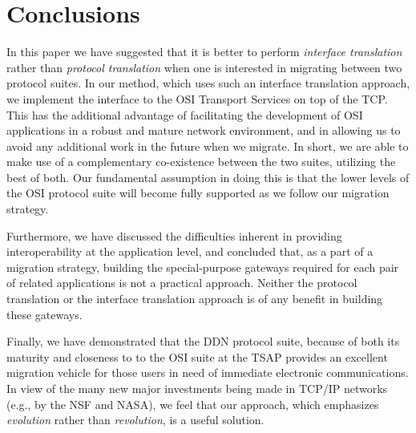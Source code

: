 
\section	{Conclusions}
In this paper we have suggested that it is better to perform
{\em interface translation\/} rather than {\em protocol translation\/}
when one is interested in migrating between two protocol suites.
In our method,
which uses such an interface translation approach,
we implement the interface to the OSI Transport Services on top of the TCP.
This has the additional advantage of facilitating the development of OSI
applications in a robust and mature network environment,
and in allowing us to avoid any additional work in the future when we migrate.
In short,
we are able to make use of a complementary co-existence between the two
suites,
utilizing the best of both.
Our fundamental assumption in doing this is that the lower levels of the OSI
protocol suite will become fully supported as we follow our
migration strategy.

Furthermore,
we have discussed the difficulties inherent in providing interoperability at
the application level,
and concluded that, as a part of a migration strategy,
building the special-purpose gateways required for each pair of related
applications is not a practical approach.
Neither the protocol translation or the interface translation approach is of
any benefit in building these gateways.

Finally,
we have demonstrated that the DDN protocol suite,
because of both its maturity and closeness to to the OSI suite at the TSAP
provides an excellent migration vehicle for those users in need of
immediate electronic communications.
In view of the many new major investments being made in TCP/IP networks
(e.g., by the NSF and NASA),
we feel that our approach,
which emphasizes {\em evolution\/} rather than {\em revolution\/},
is a useful solution.
